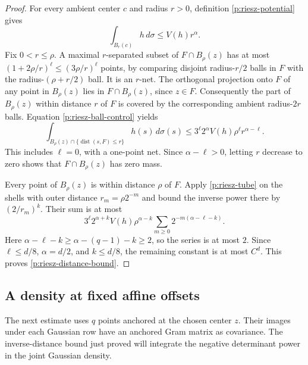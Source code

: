 \begin{proof}
For every ambient center $c$ and radius $r>0$, definition
\eqref{p:riesz-potential} gives
\begin{equation}\label{p:riesz-ball-control}
 \int_{B_r(c)}h\,d\sigma\le V(h)r^\alpha .
\end{equation}
Fix $0<r\le\rho$.  A maximal $r$-separated subset of
$F\cap B_\rho(z)$ has at most $(1+2\rho/r)^\ell
\le(3\rho/r)^\ell$ points, by comparing disjoint radius-$r/2$
balls in $F$ with the radius-$(\rho+r/2)$ ball.  It is an
$r$-net.  The orthogonal projection onto $F$ of any point in
$B_\rho(z)$ lies in $F\cap B_\rho(z)$, since $z\in F$.
Consequently the part of $B_\rho(z)$ within distance $r$ of $F$
is covered by the corresponding ambient radius-$2r$ balls.
Equation \eqref{p:riesz-ball-control} yields
\begin{equation}\label{p:riesz-tube}
 \int_{B_\rho(z)\cap\{\operatorname{dist}(s,F)\le r\}}
       h(s)\,d\sigma(s)
 \le 3^\ell2^\alpha V(h)\rho^\ell r^{\alpha-\ell}.
\end{equation}
This includes $\ell=0$, with a one-point net.  Since
$\alpha-\ell>0$, letting $r$ decrease to zero shows that
$F\cap B_\rho(z)$ has zero mass.

Every point of $B_\rho(z)$ is within distance $\rho$ of $F$.
Apply \eqref{p:riesz-tube} on the shells with outer distance
$r_m=\rho2^{-m}$ and bound the inverse power there by
$(2/r_m)^k$.  Their sum is at most
\[
 3^\ell2^{\alpha+k}V(h)\rho^{\alpha-k}
 \sum_{m\ge0}2^{-m(\alpha-\ell-k)}.
\]
Here
$\alpha-\ell-k\ge\alpha-(q-1)-k\ge2$,
so the series is at most $2$.  Since
$\ell\le d/8$, $\alpha=d/2$, and $k\le d/8$, the remaining
constant is at most $C^d$.  This proves
\eqref{p:riesz-distance-bound}.
\end{proof}

\subsection{A density at fixed affine offsets}

The next estimate uses $q$ points anchored at the chosen center $z$.
Their images under each Gaussian row have an anchored Gram matrix as
covariance. The inverse-distance bound just proved will integrate the
negative determinant power in the joint Gaussian density.


